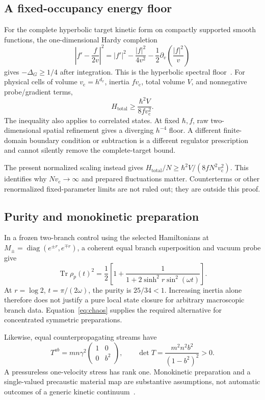 \documentclass[11pt]{article}
\newcommand{\Tr}{\operatorname{Tr}}\newcommand{\dd}{\mathrm d}
\begin{document}
\subsection{A fixed-occupancy energy floor}
For the complete hyperbolic target kinetic form on compactly supported smooth functions, the one-dimensional Hardy completion
\[
\left|f'-\frac{f}{2v}\right|^2
=|f'|^2-\frac{|f|^2}{4v^2}
-\frac12\partial_v\left(\frac{|f|^2}{v}\right)
\]
gives $-\Delta_G\ge1/4$ after integration. This is the hyperbolic spectral floor~\cite{Hardy}. For physical cells of volume $v_{\mathrm c}=h^{d_x}$, inertia $fv_{\mathrm c}$, total volume $V$, and nonnegative probe/gradient terms,
\[
H_{\mathrm{total}}\ge\frac{\hbar^2V}{8fv_{\mathrm c}^2}.
\]
The inequality also applies to correlated states. At fixed $\hbar,f$, raw two-dimensional spatial refinement gives a diverging $h^{-4}$ floor. A different finite-domain boundary condition or subtraction is a different regulator prescription and cannot silently remove the complete-target bound.

The present normalized scaling instead gives
$H_{\mathrm{total}}/N\ge\hbar^2V/(8fN^2v_{\mathrm c}^2)$.
This identifies why $Nv_{\mathrm c}\to\infty$ and prepared fluctuations matter. Counterterms or other renormalized fixed-parameter limits are not ruled out; they are outside this proof.

\subsection{Purity and monokinetic preparation}
In a frozen two-branch control using the selected Hamiltonians at
$M_\pm=\operatorname{diag}(e^{\pm r},e^{\mp r})$, a coherent equal branch superposition and vacuum probe give
\[
\Tr\rho_p(t)^2
=\frac12\left[1+\frac1{1+2\sinh^2r\sin^2(\omega t)}\right].
\]
At $r=\log2$, $t=\pi/(2\omega)$, the purity is $25/34<1$. Increasing inertia alone therefore does not justify a pure local state closure for arbitrary macroscopic branch data. Equation~\eqref{eq:chaos} supplies the required alternative for concentrated symmetric preparations.

Likewise, equal counterpropagating streams have
\[
T^{ab}=mn\gamma^2\begin{pmatrix}1&0\\0&b^2\end{pmatrix},
\qquad \det T=\frac{m^2n^2b^2}{(1-b^2)^2}>0.
\]
A pressureless one-velocity stress has rank one. Monokinetic preparation and a single-valued precaustic material map are substantive assumptions, not automatic outcomes of a generic kinetic continuum~\cite{LionsPaul}.
\end{document}
